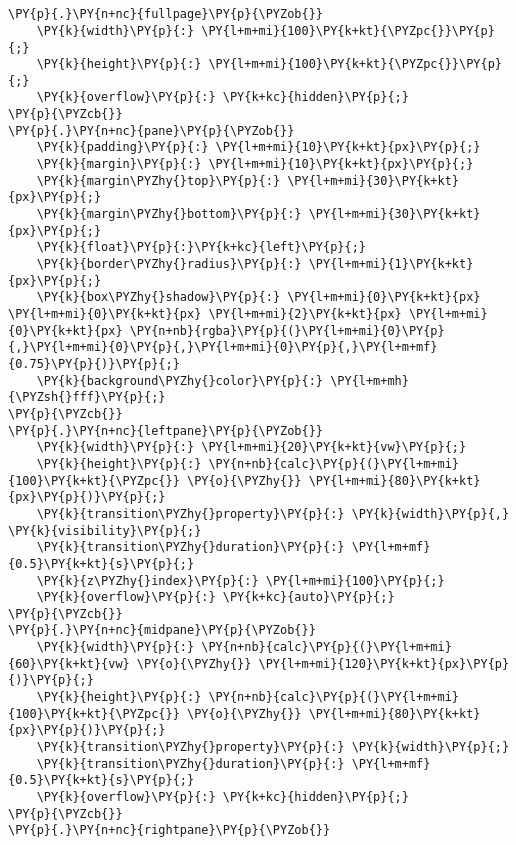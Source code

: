\section*{}

\begin{Verbatim}[commandchars=\\\{\}]
\PY{p}{.}\PY{n+nc}{fullpage}\PY{p}{\PYZob{}}
    \PY{k}{width}\PY{p}{:} \PY{l+m+mi}{100}\PY{k+kt}{\PYZpc{}}\PY{p}{;}
    \PY{k}{height}\PY{p}{:} \PY{l+m+mi}{100}\PY{k+kt}{\PYZpc{}}\PY{p}{;}
    \PY{k}{overflow}\PY{p}{:} \PY{k+kc}{hidden}\PY{p}{;}
\PY{p}{\PYZcb{}}
\PY{p}{.}\PY{n+nc}{pane}\PY{p}{\PYZob{}}
    \PY{k}{padding}\PY{p}{:} \PY{l+m+mi}{10}\PY{k+kt}{px}\PY{p}{;}
    \PY{k}{margin}\PY{p}{:} \PY{l+m+mi}{10}\PY{k+kt}{px}\PY{p}{;}
    \PY{k}{margin\PYZhy{}top}\PY{p}{:} \PY{l+m+mi}{30}\PY{k+kt}{px}\PY{p}{;}
    \PY{k}{margin\PYZhy{}bottom}\PY{p}{:} \PY{l+m+mi}{30}\PY{k+kt}{px}\PY{p}{;}
    \PY{k}{float}\PY{p}{:}\PY{k+kc}{left}\PY{p}{;}
    \PY{k}{border\PYZhy{}radius}\PY{p}{:} \PY{l+m+mi}{1}\PY{k+kt}{px}\PY{p}{;}
    \PY{k}{box\PYZhy{}shadow}\PY{p}{:} \PY{l+m+mi}{0}\PY{k+kt}{px} \PY{l+m+mi}{0}\PY{k+kt}{px} \PY{l+m+mi}{2}\PY{k+kt}{px} \PY{l+m+mi}{0}\PY{k+kt}{px} \PY{n+nb}{rgba}\PY{p}{(}\PY{l+m+mi}{0}\PY{p}{,}\PY{l+m+mi}{0}\PY{p}{,}\PY{l+m+mi}{0}\PY{p}{,}\PY{l+m+mf}{0.75}\PY{p}{)}\PY{p}{;}
    \PY{k}{background\PYZhy{}color}\PY{p}{:} \PY{l+m+mh}{\PYZsh{}fff}\PY{p}{;}
\PY{p}{\PYZcb{}}
\PY{p}{.}\PY{n+nc}{leftpane}\PY{p}{\PYZob{}}
    \PY{k}{width}\PY{p}{:} \PY{l+m+mi}{20}\PY{k+kt}{vw}\PY{p}{;}
    \PY{k}{height}\PY{p}{:} \PY{n+nb}{calc}\PY{p}{(}\PY{l+m+mi}{100}\PY{k+kt}{\PYZpc{}} \PY{o}{\PYZhy{}} \PY{l+m+mi}{80}\PY{k+kt}{px}\PY{p}{)}\PY{p}{;}
    \PY{k}{transition\PYZhy{}property}\PY{p}{:} \PY{k}{width}\PY{p}{,} \PY{k}{visibility}\PY{p}{;}
    \PY{k}{transition\PYZhy{}duration}\PY{p}{:} \PY{l+m+mf}{0.5}\PY{k+kt}{s}\PY{p}{;}
    \PY{k}{z\PYZhy{}index}\PY{p}{:} \PY{l+m+mi}{100}\PY{p}{;}
    \PY{k}{overflow}\PY{p}{:} \PY{k+kc}{auto}\PY{p}{;}
\PY{p}{\PYZcb{}}
\PY{p}{.}\PY{n+nc}{midpane}\PY{p}{\PYZob{}}
    \PY{k}{width}\PY{p}{:} \PY{n+nb}{calc}\PY{p}{(}\PY{l+m+mi}{60}\PY{k+kt}{vw} \PY{o}{\PYZhy{}} \PY{l+m+mi}{120}\PY{k+kt}{px}\PY{p}{)}\PY{p}{;}
    \PY{k}{height}\PY{p}{:} \PY{n+nb}{calc}\PY{p}{(}\PY{l+m+mi}{100}\PY{k+kt}{\PYZpc{}} \PY{o}{\PYZhy{}} \PY{l+m+mi}{80}\PY{k+kt}{px}\PY{p}{)}\PY{p}{;}
    \PY{k}{transition\PYZhy{}property}\PY{p}{:} \PY{k}{width}\PY{p}{;}
    \PY{k}{transition\PYZhy{}duration}\PY{p}{:} \PY{l+m+mf}{0.5}\PY{k+kt}{s}\PY{p}{;}
    \PY{k}{overflow}\PY{p}{:} \PY{k+kc}{hidden}\PY{p}{;}
\PY{p}{\PYZcb{}}
\PY{p}{.}\PY{n+nc}{rightpane}\PY{p}{\PYZob{}}

\end{Verbatim}
